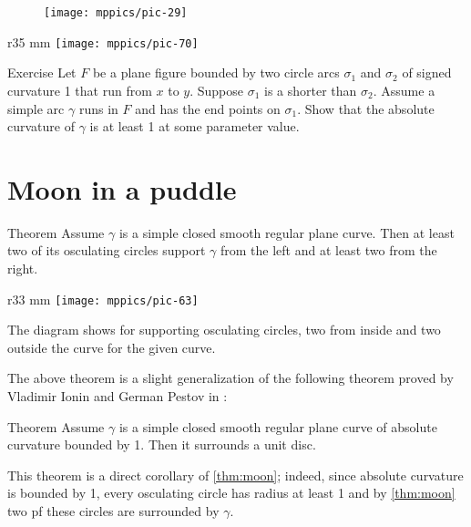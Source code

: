 \begin{figure}[h!]
\vskip-0mm
\centering
\texttt{[image: mppics/pic-29]}
\vskip0mm
\end{figure}

{

\begin{wrapfigure}{r}{35 mm}
\vskip-4mm
\centering
\texttt{[image: mppics/pic-70]}
\vskip0mm
\end{wrapfigure}

\begin{thm}{Exercise}
Let $F$ be a plane figure bounded by two circle arcs $\sigma_1$ and $\sigma_2$ of signed curvature 1 that run from $x$ to $y$.
Suppose $\sigma_1$ is a shorter than $\sigma_2$.
Assume a simple arc $\gamma$ runs in $F$ and has the end points on $\sigma_1$.
Show that the absolute curvature of $\gamma$ is at least 1 at some parameter value.

\end{thm}

}

\section*{Moon in a puddle}

\begin{thm}{Theorem}\label{thm:moon}
Assume $\gamma$ is a simple closed smooth regular plane curve.
Then at least two of its osculating circles support $\gamma$ from the left and  at least two from the right.
\end{thm}

\begin{wrapfigure}{r}{33 mm}
\vskip4mm
\centering
\texttt{[image: mppics/pic-63]}
\vskip0mm
\end{wrapfigure}

The diagram shows for supporting osculating circles, two from inside and two outside the curve for the given curve.

The above theorem is a slight generalization of the following theorem proved by Vladimir Ionin and German Pestov in \cite{pestov-ionin}:

\begin{thm}{Theorem}\label{thm:moon-orginal}
Assume $\gamma$ is a simple closed smooth regular plane curve of absolute curvature bounded by 1.
Then it surrounds a unit disc.
\end{thm}

This theorem is a direct corollary of \ref{thm:moon};
indeed, since absolute curvature is bounded by 1, every osculating circle has radius at least 1 and by \ref{thm:moon} two pf these circles are surrounded by $\gamma$.

